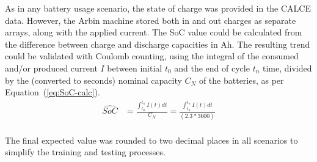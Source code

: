 %
As in any battery usage scenario, the state of charge was provided in the CALCE data.
However, the Arbin machine stored both in and out charges as separate arrays, along with the applied current.
The SoC value could be calculated from the difference between charge and discharge capacities in Ah.
The resulting trend could be validated with Coulomb counting, using the integral of the consumed and/or produced current $I$ between initial $t_0$ and the end of cycle $t_n$ time, divided by the (converted to seconds) nominal capacity $C_{N}$ of the batteries, as per \mbox{Equation~(\ref{eq:SoC-calc})}.
\begin{equation}
    \begin{split}
        \hat{SoC} &= \frac{\int_{t_0}^{t_n} I(t)dt} {C_{N}} = \frac{\int_{t_0}^{t_n} I(t)dt} {(2.3*3600)} \\
        \label{eq:SoC-calc}
    \end{split}
\end{equation}
\vspace{-16pt}

The final expected value was rounded to two decimal places in all scenarios to simplify the training and testing processes.

